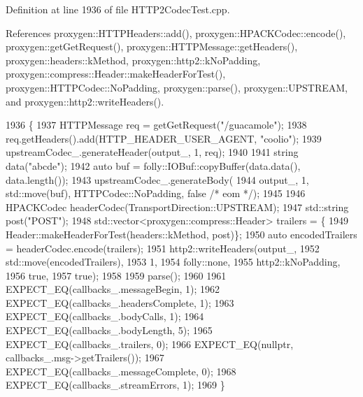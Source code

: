 Definition at line 1936 of file H\+T\+T\+P2\+Codec\+Test.\+cpp.



References proxygen\+::\+H\+T\+T\+P\+Headers\+::add(), proxygen\+::\+H\+P\+A\+C\+K\+Codec\+::encode(), proxygen\+::get\+Get\+Request(), proxygen\+::\+H\+T\+T\+P\+Message\+::get\+Headers(), proxygen\+::headers\+::k\+Method, proxygen\+::http2\+::k\+No\+Padding, proxygen\+::compress\+::\+Header\+::make\+Header\+For\+Test(), proxygen\+::\+H\+T\+T\+P\+Codec\+::\+No\+Padding, proxygen\+::parse(), proxygen\+::\+U\+P\+S\+T\+R\+E\+AM, and proxygen\+::http2\+::write\+Headers().


\begin{DoxyCode}
1936                                                   \{
1937   HTTPMessage req = getGetRequest(\textcolor{stringliteral}{"/guacamole"});
1938   req.getHeaders().add(HTTP\_HEADER\_USER\_AGENT, \textcolor{stringliteral}{"coolio"});
1939   upstreamCodec\_.generateHeader(output\_, 1, req);
1940 
1941   \textcolor{keywordtype}{string} data(\textcolor{stringliteral}{"abcde"});
1942   \textcolor{keyword}{auto} buf = folly::IOBuf::copyBuffer(data.data(), data.length());
1943   upstreamCodec\_.generateBody(
1944       output\_, 1, std::move(buf), HTTPCodec::NoPadding, \textcolor{keyword}{false} \textcolor{comment}{/* eom */});
1945 
1946   HPACKCodec headerCodec(TransportDirection::UPSTREAM);
1947   std::string post(\textcolor{stringliteral}{"POST"});
1948   std::vector<proxygen::compress::Header> trailers = \{
1949       Header::makeHeaderForTest(headers::kMethod, post)\};
1950   \textcolor{keyword}{auto} encodedTrailers = headerCodec.encode(trailers);
1951   http2::writeHeaders(output\_,
1952                       std::move(encodedTrailers),
1953                       1,
1954                       folly::none,
1955                       http2::kNoPadding,
1956                       \textcolor{keyword}{true},
1957                       \textcolor{keyword}{true});
1958 
1959   parse();
1960 
1961   EXPECT\_EQ(callbacks\_.messageBegin, 1);
1962   EXPECT\_EQ(callbacks\_.headersComplete, 1);
1963   EXPECT\_EQ(callbacks\_.bodyCalls, 1);
1964   EXPECT\_EQ(callbacks\_.bodyLength, 5);
1965   EXPECT\_EQ(callbacks\_.trailers, 0);
1966   EXPECT\_EQ(\textcolor{keyword}{nullptr}, callbacks\_.msg->getTrailers());
1967   EXPECT\_EQ(callbacks\_.messageComplete, 0);
1968   EXPECT\_EQ(callbacks\_.streamErrors, 1);
1969 \}
\end{DoxyCode}
